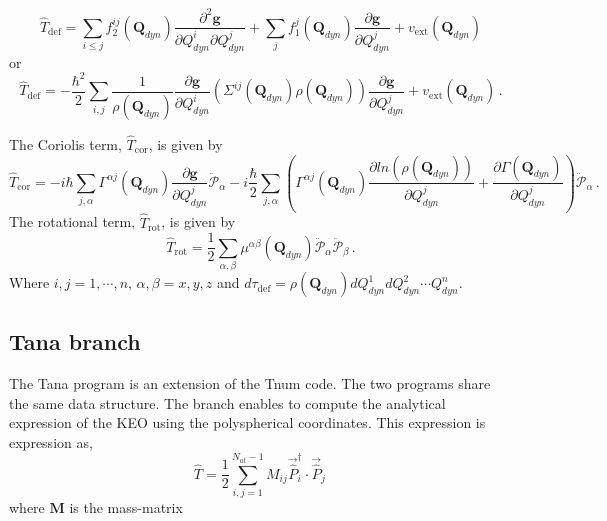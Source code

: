 \documentclass[a4paper,10pt]{article}
\begin{document}
\begin{equation}
  \hat{T}_\mathrm{def}= \sum_{i\le j} f_2^{ij}(\mathbf{Q}_{dyn})
           \frac{\partial^2 \mathbf{g}}{\partial Q_{dyn}^i \partial Q_{dyn}^j}
           +\sum_{j} f_1^{j}(\mathbf{Q}_{dyn})
         \frac{\partial \mathbf{g}}{\partial Q_{dyn}^j}
         + v_{\mathrm{ext}}(\mathbf{Q}_{dyn})
 \end{equation}
 or
\begin{equation}
  \hat{T}_\mathrm{def}= -\frac{\hbar^2}{2}\sum_{i, j} \frac{1} {\rho(\mathbf{Q}_{dyn})}
           \frac{\partial \mathbf{g}}{ \partial Q_{dyn}^i} 
           \left(  \Sigma^{ij}(\mathbf{Q}_{dyn}) \rho(\mathbf{Q}_{dyn})\right)
           \frac{\partial \mathbf{g}}{ \partial Q_{dyn}^j} 
         + v_{\mathrm{ext}}(\mathbf{Q}_{dyn})\,.
 \end{equation}


The Coriolis term, $\hat{T}_\mathrm{cor}$, is given by
$$
  \hat{T}_\mathrm{cor}= -i\hbar \sum_{j, \alpha} \Gamma^{\alpha j} (\mathbf{Q}_{dyn})
  \frac{\partial \mathbf{g}}{\partial {Q}_{dyn}^j} \ddot{\mathcal{P}}_\alpha
  -i\frac{\hbar}{2} \sum_{j, \alpha} \left(\Gamma^{\alpha j} (\mathbf{Q}_{dyn})
  \frac{\partial ln(\rho(\mathbf{Q}_{dyn}))}{\partial {Q}_{dyn}^j}+ 
  \frac{\partial \Gamma(\mathbf{Q}_{dyn})}{\partial {Q}_{dyn}^j} 
  \right)
  \ddot{\mathcal{P}}_\alpha\,.
  $$
The rotational term, $\hat{T}_\mathrm{rot}$, is given by
$$
  \hat{T}_\mathrm{rot}= \frac{1}{2} \sum_{\alpha, \beta} \mu^{\alpha \beta} (\mathbf{Q}_{dyn})
  \ddot{\mathcal{P}}_\alpha
  \ddot{\mathcal{P}}_\beta\,.
$$
Where $i, j = 1, \cdots, n$, $\alpha, \beta = x,y,z$ and $d\tau_\mathrm{def}
= \rho(\mathbf{Q}_{dyn})d{Q}_{dyn}^1 d {Q}_{dyn}^2\cdots{Q}_{dyn}^n$.
\subsection{Tana branch}
The Tana program  is an extension of the Tnum code. The two programs share the same data structure. 
The branch enables to compute the analytical expression of the KEO using the
polyspherical coordinates. 
This expression is expression as,
$$ 
\hat{T} = \frac{1}{2}\sum_{i,j=1}^{N_{at}-1}  M_{ij}
  \vec{\hat{P}}_i^\dagger \cdot \vec{\hat{P}}_{j}\, 
$$
where $\mathbf{M}$ is the mass-matrix
\end{document}
